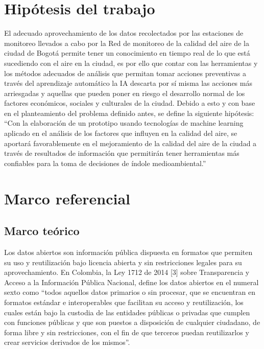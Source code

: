 \section{Hipótesis del trabajo}

El adecuado aprovechamiento de los datos recolectados por las estaciones de monitoreo llevados a cabo por la Red de monitoreo de la calidad del aire de la ciudad de Bogotá permite tener un conocimiento en tiempo real de lo que está sucediendo con el aire en la ciudad, es por ello que contar con las herramientas y los métodos adecuados de análisis que permitan tomar acciones preventivas a través del aprendizaje automático la IA descarta por sí misma las acciones más arriesgadas y aquellas que pueden poner en riesgo el desarrollo normal de los factores económicos, sociales y culturales de la ciudad.
Debido a esto y con base en el planteamiento del problema definido antes, se define la siguiente hipótesis: “Con la elaboración de un prototipo usando tecnologías de machine learning aplicado en el análisis de los factores que influyen en la calidad del aire, se aportará favorablemente en el mejoramiento de la calidad del aire de la ciudad a través de resultados de información que permitirán tener herramientas más confiables para la toma de decisiones de índole medioambiental.”

\section{Marco referencial}

\subsection{Marco teórico}

Los datos abiertos son información pública dispuesta en formatos que permiten su uso y reutilización bajo licencia abierta y sin restricciones legales para su aprovechamiento. 
En Colombia, la Ley 1712 de 2014 [3] sobre Transparencia y Acceso a la Información Pública Nacional, define los datos abiertos en el numeral sexto como “todos aquellos datos primarios o sin procesar, que se encuentran en formatos estándar e interoperables que facilitan su acceso y reutilización, los cuales están bajo la custodia de las entidades públicas o privadas que cumplen con funciones públicas y que son puestos a disposición de cualquier ciudadano, de forma libre y sin restricciones, con el fin de que terceros puedan reutilizarlos y crear servicios derivados de los mismos”.	


